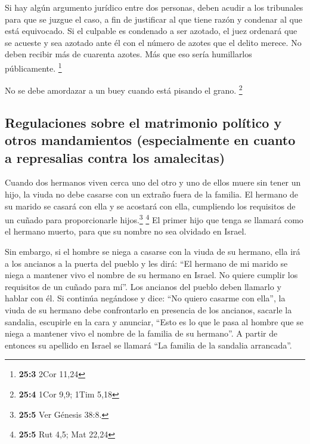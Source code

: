  Si hay algún argumento jurídico entre dos personas, deben
acudir a los tribunales para que se juzgue el caso, a fin de justificar
al que tiene razón y condenar al que está equivocado.  Si
el culpable es condenado a ser azotado, el juez ordenará que se acueste
y sea azotado ante él con el número de azotes que el delito merece.
 No deben recibir más de cuarenta azotes. Más que eso
sería humillarlos públicamente. \footnote{\textbf{25:3} 2Cor 11,24}

 No se debe amordazar a un buey cuando está pisando el
grano. \footnote{\textbf{25:4} 1Cor 9,9; 1Tim 5,18}

\hypertarget{regulaciones-sobre-el-matrimonio-poluxedtico-y-otros-mandamientos-especialmente-en-cuanto-a-represalias-contra-los-amalecitas}{%
\subsection{Regulaciones sobre el matrimonio político y otros
mandamientos (especialmente en cuanto a represalias contra los
amalecitas)}\label{regulaciones-sobre-el-matrimonio-poluxedtico-y-otros-mandamientos-especialmente-en-cuanto-a-represalias-contra-los-amalecitas}}

 Cuando dos hermanos viven cerca uno del otro y uno de
ellos muere sin tener un hijo, la viuda no debe casarse con un extraño
fuera de la familia. El hermano de su marido se casará con ella y se
acostará con ella, cumpliendo los requisitos de un cuñado para
proporcionarle hijos.\footnote{\textbf{25:5} Ver Génesis 38:8.}
\footnote{\textbf{25:5} Rut 4,5; Mat 22,24}  El primer
hijo que tenga se llamará como el hermano muerto, para que su nombre no
sea olvidado en Israel.

 Sin embargo, si el hombre se niega a casarse con la viuda
de su hermano, ella irá a los ancianos a la puerta del pueblo y les
dirá: ``El hermano de mi marido se niega a mantener vivo el nombre de su
hermano en Israel. No quiere cumplir los requisitos de un cuñado para
mí''.  Los ancianos del pueblo deben llamarlo y hablar con
él. Si continúa negándose y dice: ``No quiero casarme con ella'',
 la viuda de su hermano debe confrontarlo en presencia de
los ancianos, sacarle la sandalia, escupirle en la cara y anunciar,
``Esto es lo que le pasa al hombre que se niega a mantener vivo el
nombre de la familia de su hermano''.  A partir de
entonces su apellido en Israel se llamará ``La familia de la sandalia
arrancada''.


